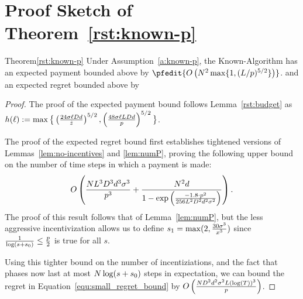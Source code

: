 \section{Proof Sketch of Theorem~\ref{rst:known-p}}
\label{sec:discussion-proof2}


\begin{rtheorem}{Theorem}{\ref{rst:known-p}}
Under Assumption~\ref{a:known-p}, the Known-\MinProb Algorithm has an expected payment bounded above by 
$\pfedit{O\left(N^2 \max\{1, (L/p)^{5/2}\}\right)}$.
and an expected regret bounded above by
\end{rtheorem}

\begin{proof}
	The proof of the expected payment bound follows Lemma~\ref{rst:budget} 
    as $h(\ell) := \max\big\{ \left(\frac{24\sigma \ell D d}{\hat{z}} \right)^{5/2},
        \left( \frac{48\sigma \ell L D d}{p} \right)^{5/2}\big\}$.


The proof of the expected regret bound first establishes tightened versions of Lemmas~\ref{lem:no-incentives} and \ref{lem:numP},
proving the following upper bound on the number of time steps in which a payment is made:
\begin{align}
O\left(\frac{N L^3 D^3 d^3 \sigma^3}{p^3}
  + \frac{N^2 d}{1 - \exp \left(
    \frac{-1.8 \cdot p^2}{256 L^2 D^2 d^2 \sigma^2}
  \right)} \right). \nonumber 
\end{align}
The proof of this result follows that of Lemma~\ref{lem:numP},
but the less aggressive incentivization allows us to define $s_1 = \max(2, \frac{30 \sigma^3}{x^3})$ since $\frac{1}{\log(s+s_0)} \leq \frac{p}{2}$ is true for all $s$.

Using this tighter bound on the number of incentiziations, and the fact that phases now last at most $N \log(s+s_0)$ steps in expectation, we can bound the regret in Equation~\ref{equ:small_regret_bound} by
$O\left(\frac{ND^2 d^2\sigma^2 L(\log(T))^3}{p}\right)$.
\end{proof}
